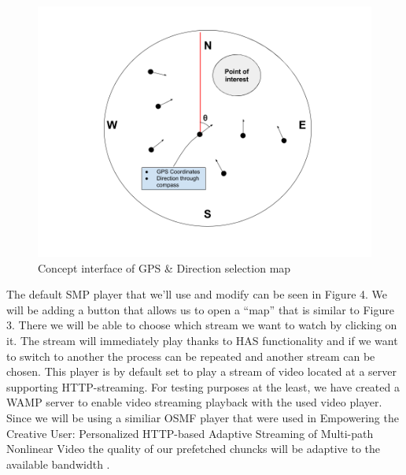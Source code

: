\documentclass[9pt,a4paper]{acmproc}
\begin{document}
\begin{figure}[!ht]
\begin{center}
\includegraphics[scale=0.3]{teomet.png}
\caption{Concept interface of GPS \& Direction selection map}
\end{center}
\end{figure}


The default SMP player that we’ll use and modify can be seen in Figure 4. We will be adding a button that allows us to open a “map” that is similar to Figure 3. There we will be able to choose which stream we want to watch by clicking on it. The stream will immediately play thanks to HAS functionality and if we want to switch to another the process can be repeated and another stream can be chosen. This player is by default set to play a stream of video located at a server supporting HTTP-streaming. For testing purposes at the least, we have created a WAMP server to enable video streaming playback with the used video player. Since we will be using a similiar OSMF player that were used in Empowering the Creative User: Personalized HTTP-based Adaptive Streaming of Multi-path Nonlinear Video the quality of our prefetched chuncks will be adaptive to the available bandwidth \cite[s.~591-596]{hasmultipath}.
\end{document}
